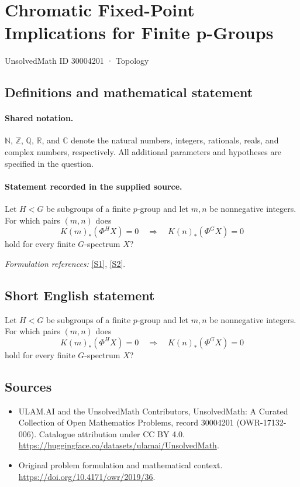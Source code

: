 \documentclass[11pt]{article}
\newcommand{\sref}[2]{\hyperlink{source:#1:#2}{[S#2]}}
\begin{document}
\setcounter{section}{30004200}
\section{Chromatic Fixed-Point Implications for Finite p-Groups}\label{30004201}
{\small UnsolvedMath ID 30004201 · Topology}
\subsection{Definitions and mathematical statement}

\paragraph{Shared notation.}$\mathbb N$, $\mathbb Z$, $\mathbb Q$, $\mathbb R$, and $\mathbb C$ denote the natural numbers, integers, rationals, reals, and complex numbers, respectively. All additional parameters and hypotheses are specified in the question.


\paragraph{Statement recorded in the supplied source.}
Let $H<G$ be subgroups of a finite $p$-group and let $m,n$ be nonnegative integers. For which pairs $(m,n)$ does $$K(m)_*(\Phi^H X)=0\quad\Longrightarrow\quad K(n)_*(\Phi^G X)=0$$ hold for every finite $G$-spectrum $X$?
\par\smallskip\textit{Formulation references:} \sref{30004201}{1}, \sref{30004201}{2}.
\subsection{Short English statement}
Let $H<G$ be subgroups of a finite $p$-group and let $m,n$ be nonnegative integers. For which pairs $(m,n)$ does $$K(m)_*(\Phi^H X)=0\quad\Longrightarrow\quad K(n)_*(\Phi^G X)=0$$ hold for every finite $G$-spectrum $X$?
\subsection{Sources}
\begin{itemize}
\item[\hypertarget{source:30004201:1}{S1}] ULAM.AI and the UnsolvedMath Contributors, UnsolvedMath: A Curated Collection of Open Mathematics Problems, record 30004201 (OWR-17132-006). Catalogue attribution under CC BY 4.0.
\url{https://huggingface.co/datasets/ulamai/UnsolvedMath}.
\item[\hypertarget{source:30004201:2}{S2}] Original problem formulation and mathematical context.
\url{https://doi.org/10.4171/owr/2019/36}.
\end{itemize}
\label{end:30004201}
\end{document}
